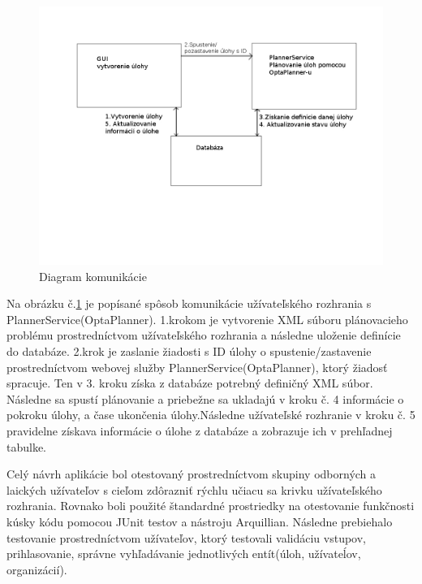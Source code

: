 \begin{figure}[htb]

\begin{center}

\includegraphics[scale=0.7]{work.jpg} 
\caption{Diagram komunikácie}
\label{work}

\end{center}

\end{figure}
Na obrázku č.\ref{work} je popísané spôsob komunikácie užívateľského rozhrania s PlannerService(OptaPlanner). 1.krokom je vytvorenie XML súboru plánovacieho problému prostredníctvom užívateľského rozhrania a následne uloženie definície do databáze. 2.krok je zaslanie žiadosti s ID úlohy o spustenie/zastavenie prostredníctvom webovej služby PlannerService(OptaPlanner), ktorý žiadosť spracuje. Ten v 3. kroku získa z databáze potrebný definičný XML súbor. Následne sa spustí plánovanie a priebežne sa ukladajú v kroku č. 4 informácie o pokroku úlohy, a čase ukončenia úlohy.Následne užívateľské rozhranie v kroku č. 5 pravidelne získava informácie o úlohe z databáze a zobrazuje ich v prehľadnej tabulke.

Celý návrh aplikácie bol otestovaný prostredníctvom skupiny odborných a laických užívateľov s cieľom zdôrazniť rýchlu učiacu sa krivku užívateľského rozhrania. Rovnako boli použité štandardné prostriedky na otestovanie funkčnosti kúsky kódu pomocou JUnit testov a nástroju Arquillian. Následne prebiehalo testovanie prostredníctvom užívateľov, ktorý testovali validáciu vstupov, prihlasovanie, správne vyhľadávanie jednotlivých entít(úloh, užívateĺov, organizácií).

